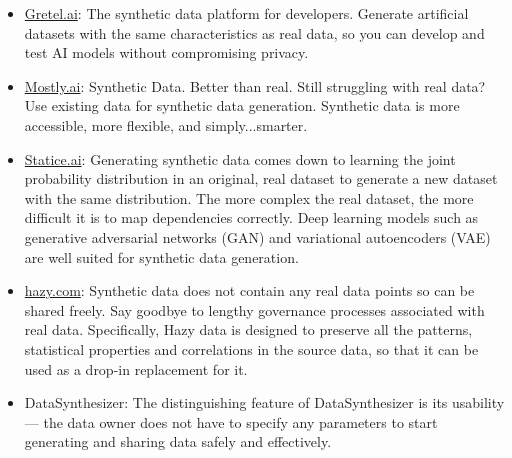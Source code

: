 \documentclass[t,8pt,utfx8]{beamer}
\begin{document}
\begin{spacing}{1.25}
{\begin{itemize}
    \item \url{Gretel.ai}: The synthetic data platform for developers. Generate artificial datasets with the same characteristics as real data, so you can develop and test AI models without compromising privacy.
    \item \url{Mostly.ai}: Synthetic Data. Better than real. Still struggling with real data? Use existing data for synthetic data generation. Synthetic data is more accessible, more flexible, and simply...smarter.
    \item \url{Statice.ai}: Generating synthetic data comes down to learning the joint probability distribution in an original, real dataset to generate a new dataset with the same distribution.  The more complex the real dataset, the more difficult it is to map dependencies correctly. Deep learning models such as generative adversarial networks (GAN) and variational autoencoders (VAE) are well suited for synthetic data generation.
    \item \url{hazy.com}: Synthetic data does not contain any real data points so can be shared freely. Say goodbye to lengthy governance processes associated with real data.  Specifically, Hazy data is designed to preserve all the patterns, statistical properties and correlations in the source data, so that it can be used as a drop-in replacement for it.
    \item DataSynthesizer: The distinguishing feature of DataSynthesizer is its usability — the data owner does not have to specify any parameters to start generating and sharing data safely and effectively.
\end{itemize}
}





\end{spacing}
\end{document}
